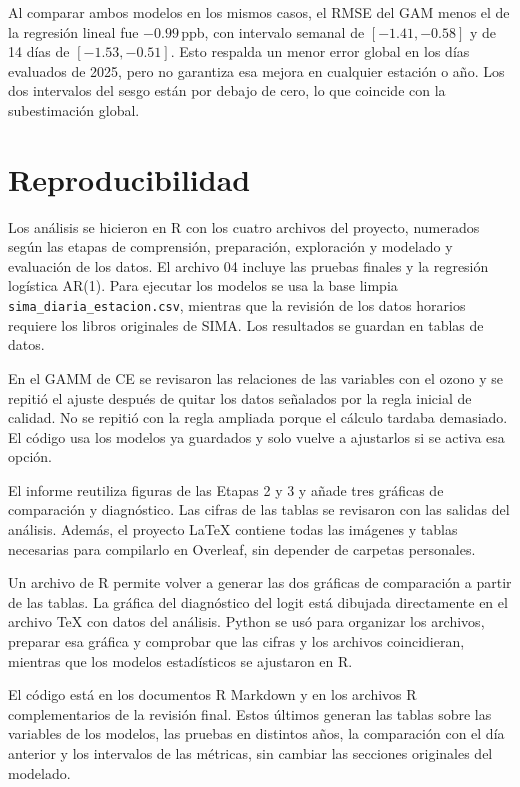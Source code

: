 \documentclass[11pt,letterpaper]{article}
\newcommand{\ppb}{\,ppb}
\newenvironment{cambio}{}{}
\begin{document}
\begin{cambio}
Al comparar ambos modelos en los mismos casos, el RMSE del GAM menos el de la regresión lineal fue $-0.99$\ppb, con intervalo semanal de $[-1.41,-0.58]$ y de 14 días de $[-1.53,-0.51]$. Esto respalda un menor error global en los días evaluados de 2025, pero no garantiza esa mejora en cualquier estación o año. Los dos intervalos del sesgo están por debajo de cero, lo que coincide con la subestimación global.
\end{cambio}
\clearpage

\section*{Reproducibilidad}
Los análisis se hicieron en R con los cuatro archivos del proyecto, numerados según las etapas de comprensión, preparación, exploración y modelado y evaluación de los datos. El archivo 04 incluye las pruebas finales y la regresión logística AR(1). Para ejecutar los modelos se usa la base limpia \nolinkurl{sima_diaria_estacion.csv}, mientras que la revisión de los datos horarios requiere los libros originales de SIMA. Los resultados se guardan en tablas de datos.

En el GAMM de CE se revisaron las relaciones de las variables con el ozono y se repitió el ajuste después de quitar los datos señalados por la regla inicial de calidad. No se repitió con la regla ampliada porque el cálculo tardaba demasiado. El código usa los modelos ya guardados y solo vuelve a ajustarlos si se activa esa opción.

El informe reutiliza figuras de las Etapas 2 y 3 y añade tres gráficas de comparación y diagnóstico. Las cifras de las tablas se revisaron con las salidas del análisis. Además, el proyecto LaTeX contiene todas las imágenes y tablas necesarias para compilarlo en Overleaf, sin depender de carpetas personales.

Un archivo de R permite volver a generar las dos gráficas de comparación a partir de las tablas. La gráfica del diagnóstico del logit está dibujada directamente en el archivo TeX con datos del análisis. Python se usó para organizar los archivos, preparar esa gráfica y comprobar que las cifras y los archivos coincidieran, mientras que los modelos estadísticos se ajustaron en R.

El código está en los documentos R Markdown y en los archivos R complementarios de la revisión final. Estos últimos generan las tablas sobre las variables de los modelos, las pruebas en distintos años, la comparación con el día anterior y los intervalos de las métricas, sin cambiar las secciones originales del modelado.
\end{document}
